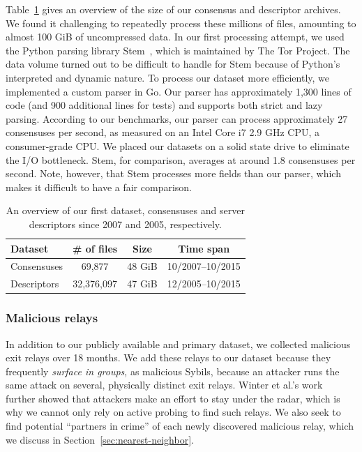 Table~\ref{tab:collector-dataset} gives an overview of the size of our consensus
and descriptor archives.  We found it challenging to repeatedly process these
millions of files, amounting to almost 100 GiB of uncompressed data.  In our
first processing attempt, we used the Python parsing library Stem~\cite{stem},
which is maintained by The Tor Project.  The data volume turned out to be
difficult to handle for Stem because of Python's interpreted and dynamic nature.
To process our dataset more efficiently, we implemented a custom parser in Go.
Our parser has approximately 1,300 lines of code (and 900 additional lines for
tests) and supports both strict and lazy parsing.  According to our benchmarks,
our parser can process approximately 27 consensuses per second, as measured on
an Intel Core i7 2.9 GHz CPU, a consumer-grade CPU.  We placed our datasets on a
solid state drive to eliminate the I/O bottleneck.  Stem, for comparison,
averages at around 1.8 consensuses per second.  Note, however, that Stem
processes more fields than our parser, which makes it difficult to have a fair
comparison.

\begin{table}[t]
\small
\centering
\begin{tabular}{l c c c}
\textbf{Dataset} & \textbf{\# of files} & \textbf{Size} & \textbf{Time span} \\
\hline
Consensuses & 69,877 & 48 GiB & 10/2007--10/2015 \\
Descriptors & 32,376,097 & 47 GiB & 12/2005--10/2015 \\
\end{tabular}
\caption{An overview of our first dataset, consensuses and server descriptors
since 2007 and 2005, respectively.}
\label{tab:collector-dataset}
\end{table}

\subsubsection{Malicious relays}
In addition to our publicly available and primary dataset, we collected
malicious exit relays over 18 months.  We add these relays to our dataset
because they frequently \emph{surface in groups}, as malicious Sybils, because
an attacker runs the same attack on several, physically distinct exit
relays.  Winter et al.'s work~\cite[\S 5.2]{Winter2014a} further showed that
attackers make an effort to stay under the radar, which is why we cannot only
rely on active probing to find such relays.  We also seek to find potential
``partners in crime'' of each newly discovered malicious relay, which we discuss
in Section~\ref{sec:nearest-neighbor}.

